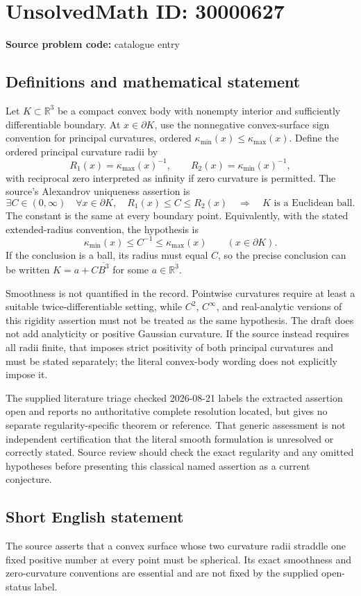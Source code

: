 \documentclass[11pt]{article}
\newcommand{\R}{\mathbb{R}}
\begin{document}
\section*{UnsolvedMath ID: 30000627}
\textbf{Source problem code:} catalogue entry
\subsection{Definitions and mathematical statement}
Let \(K\subset\R^3\) be a compact convex body with nonempty interior and sufficiently differentiable boundary. At \(x\in\partial K\), use the nonnegative convex-surface sign convention for principal curvatures, ordered \(\kappa_{\min}(x)\leq\kappa_{\max}(x)\). Define the ordered principal curvature radii by
\[
R_1(x)=\kappa_{\max}(x)^{-1},\qquad
R_2(x)=\kappa_{\min}(x)^{-1},
\]
with reciprocal zero interpreted as infinity if zero curvature is permitted. The source's Alexandrov uniqueness assertion is
\[
\exists C\in(0,\infty)\quad\forall x\in\partial K,\quad
R_1(x)\leq C\leq R_2(x)
\quad\Longrightarrow\quad K\text{ is a Euclidean ball}.
\]
The constant is the same at every boundary point. Equivalently, with the stated extended-radius convention, the hypothesis is
\[
\kappa_{\min}(x)\leq C^{-1}\leq\kappa_{\max}(x)
\qquad(x\in\partial K).
\]
If the conclusion is a ball, its radius must equal \(C\), so the precise conclusion can be written \(K=a+C\overline{B^3}\) for some \(a\in\R^3\).

Smoothness is not quantified in the record. Pointwise curvatures require at least a suitable twice-differentiable setting, while \(C^2\), \(C^\infty\), and real-analytic versions of this rigidity assertion must not be treated as the same hypothesis. The draft does not add analyticity or positive Gaussian curvature. If the source instead requires all radii finite, that imposes strict positivity of both principal curvatures and must be stated separately; the literal convex-body wording does not explicitly impose it.

The supplied literature triage checked 2026-08-21 labels the extracted assertion open and reports no authoritative complete resolution located, but gives no separate regularity-specific theorem or reference. That generic assessment is not independent certification that the literal smooth formulation is unresolved or correctly stated. Source review should check the exact regularity and any omitted hypotheses before presenting this classical named assertion as a current conjecture.
\subsection{Short English statement}
The source asserts that a convex surface whose two curvature radii straddle one fixed positive number at every point must be spherical. Its exact smoothness and zero-curvature conventions are essential and are not fixed by the supplied open-status label.
\end{document}
